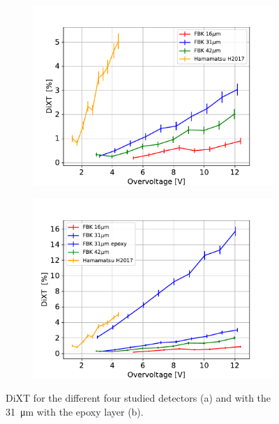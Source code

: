 \restoregeometry

\begin{figure}[htbp]
    \centering
    \begin{subfigure}{0.7\textwidth}
        \includegraphics[width=\textwidth]{gfx/plots/WA/DiXTs_wo_epoxy.pdf}
        \caption{}
    \end{subfigure}
    \hfill
    \begin{subfigure}{0.7\textwidth}
        \includegraphics[width=\textwidth]{gfx/plots/WA/DiXTs.pdf}
        \caption{}
    \end{subfigure} 
    \caption{DiXT for the different four studied detectors (a) and with the \SI{31}{\micro m} with the epoxy layer (b).}
    \label{fig:DiXT detectors}
\end{figure}


